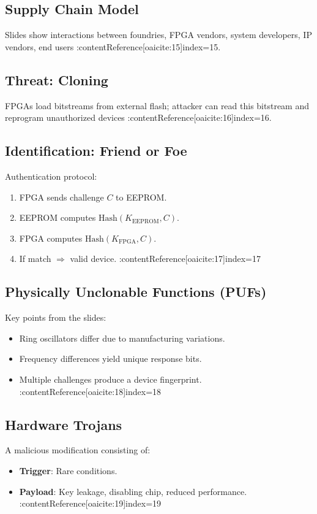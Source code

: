 \documentclass[11pt]{article}
\begin{document}
\subsection{Supply Chain Model}
Slides show interactions between foundries, FPGA vendors, system developers, IP vendors, end users
:contentReference[oaicite:15]{index=15}.

\subsection{Threat: Cloning}
FPGAs load bitstreams from external flash; attacker can read this bitstream and reprogram unauthorized devices
:contentReference[oaicite:16]{index=16}.

\subsection{Identification: Friend or Foe}
Authentication protocol:
\begin{enumerate}
    \item FPGA sends challenge $C$ to EEPROM.
    \item EEPROM computes $\mathrm{Hash}(K_{\text{EEPROM}}, C)$.
    \item FPGA computes $\mathrm{Hash}(K_{\text{FPGA}}, C)$.
    \item If match $\Rightarrow$ valid device. :contentReference[oaicite:17]{index=17}
\end{enumerate}

\subsection{Physically Unclonable Functions (PUFs)}
Key points from the slides:
\begin{itemize}
    \item Ring oscillators differ due to manufacturing variations.
    \item Frequency differences yield unique response bits.
    \item Multiple challenges produce a device fingerprint. :contentReference[oaicite:18]{index=18}
\end{itemize}

\subsection{Hardware Trojans}
A malicious modification consisting of:
\begin{itemize}
    \item \textbf{Trigger}: Rare conditions.
    \item \textbf{Payload}: Key leakage, disabling chip, reduced performance. :contentReference[oaicite:19]{index=19}
\end{itemize}
\end{document}
